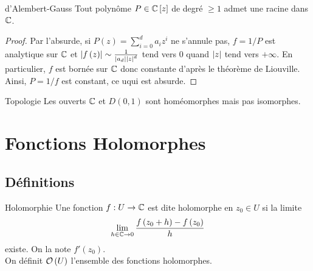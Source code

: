 \documentclass{cours}
\begin{document}
\begin{théorème}{d'Alembert-Gauss}{}
    Tout polynôme $P \in \mathbb{C}\left[z\right]$ de degré $\geq 1$ admet une racine dans $\mathbb{C}$.
\end{théorème}
\begin{proof}
    Par l'absurde, si $P\left(z\right) = \sum_{i = 0}^{d}a_{i}z^{i}$ ne s'annule pas, $f = 1/P$ est analytique sur $\mathbb{C}$ et $\left|f\left(z\right)\right| \sim \frac{1}{\left|a_{d}\right|\left|z\right|^{d}}$ tend vers $0$ quand $\left|z\right|$ tend vers $+\infty$. En particulier, $f$ est bornée sur $\mathbb{C}$ donc constante d'après le théorème de Liouville. Ainsi, $P = 1/f$ est constant, ce uqui est absurde.
\end{proof}

\begin{théorème}{Topologie}{}
    Les ouverts $\mathbb{C}$ et $D\left(0, 1\right)$ sont homéomorphes mais pas isomorphes. 
\end{théorème}


\section{Fonctions Holomorphes}
\subsection{Définitions}
\begin{définition}{Holomorphie}{}
    Une fonction $f : U \to \mathbb{C}$ est dite holomorphe en $z_{0} \in U$ si la limite \begin{equation*}\lim_{h \in \mathbb{C} \to 0} \frac{f\left(z_{0} + h\right) - f\left(z_{0}\right)}{h}\end{equation*} existe. On la note $f'\left(z_{0}\right)$.\\
    On définit $\mathcal{O}\left(U\right)$ l'ensemble des fonctions holomorphes.
\end{définition}
\end{document}
